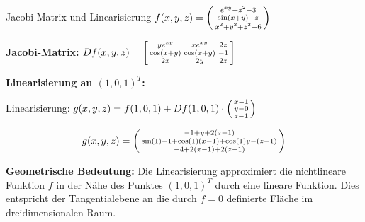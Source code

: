 \begin{example2}{Jacobi-Matrix und Linearisierung}
$f(x, y, z) = \begin{psmallmatrix} e^{xy} + z^2 - 3 \\ \sin(x + y) - z \\ x^2 + y^2 + z^2 - 6 \end{psmallmatrix}$

\textbf{Jacobi-Matrix:}
$Df(x, y, z) = \begin{bsmallmatrix} ye^{xy} & xe^{xy} & 2z \\ \cos(x + y) & \cos(x + y) & -1 \\ 2x & 2y & 2z \end{bsmallmatrix}$

\textbf{Linearisierung an $(1, 0, 1)^T$:}


Linearisierung: $g(x, y, z) = f(1, 0, 1) + Df(1, 0, 1) \cdot \begin{psmallmatrix} x - 1 \\ y - 0 \\ z - 1 \end{psmallmatrix}$

$$g(x, y, z) = \begin{psmallmatrix} -1 + y + 2(z-1) \\ \sin(1) - 1 + \cos(1)(x-1) + \cos(1)y - (z-1) \\ -4 + 2(x-1) + 2(z-1) \end{psmallmatrix}$$

\textbf{Geometrische Bedeutung:}
Die Linearisierung approximiert die nichtlineare Funktion $f$ in der Nähe des Punktes $(1, 0, 1)^T$ durch eine lineare Funktion. Dies entspricht der Tangentialebene an die durch $f = 0$ definierte Fläche im dreidimensionalen Raum.
\end{example2}

